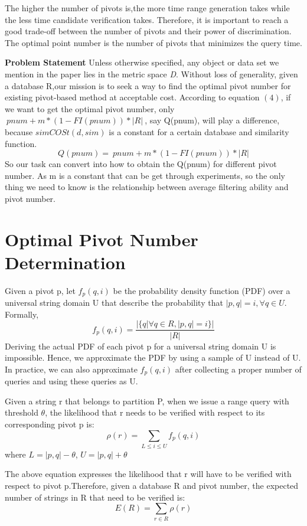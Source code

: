 \documentclass{vldb}
\begin{document}
\begin{myDef}
 The higher the number of pivots is,the more time range generation takes while the less time candidate verification takes. Therefore, it is important to reach a good trade-off between the number of pivots and their power of discrimination. The optimal point number is the number of pivots that  minimizes the query time.
\end{myDef}
\textbf{Problem Statement}
Unless otherwise specified, any object or data set we mention in the paper lies in the metric space \textit{D}. Without loss of generality, given a database R,our mission is to seek a way to find the optimal pivot number for existing pivot-based method at acceptable cost.
According to equation $(4)$, if we want to get the optimal pivot number, only $ \ pnum+m*(1-FI(pnum))*|R| \ $, say Q(pnum), will play a difference, because $simCOSt(d,sim)$ is a constant for a certain database and similarity function.
\begin{equation}Q(pnum)=\ pnum+m*(1-FI(pnum))*|R| \end{equation}
So our task can convert into how to obtain the Q(pnum) for different pivot number. As m is a constant that can be get through experiments, so the only thing we need to know is the relationship between average filtering ability and pivot number.
\section{Optimal Pivot Number Determination}


Given a pivot p, let $f_p(q,i)$ be the probability density function (PDF) over a universal string domain U that describe the probability that $|p,q|=i, \forall q \in U$.
Formally,
\begin{equation}f_p(q,i)=\frac{|\{q|\forall q \in R, |p,q|=i\}|}{|R|}\end{equation}
Deriving the actual PDF of each pivot p for a universal string domain U is impossible. Hence, we approximate the PDF by using a sample of U instead of U. In practice, we can also approximate $f_p(q,i)$ after collecting a proper number of queries and using these queries as U. 

\begin{lem}
Given a string r that belongs to partition P, when we issue a range query with threshold $\theta$, the likelihood that r needs to be verified with respect to its corresponding pivot p is:
\begin{equation}\rho(r)=\sum_{L\le i \le U} f_p(q,i)\end{equation}
where $L=|p,q|-\theta$, $U=|p,q|+\theta$
\end{lem}
The above equation expresses the likelihood that r will have to be verified with respect to pivot p.Therefore, given a database R and pivot number, the expected number of strings in R that need to be verified is: 
\begin{equation}E(R)=\sum_{r \in R}\rho(r)\end{equation}
\end{document}
